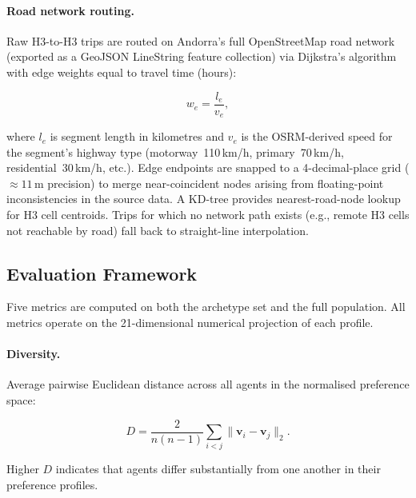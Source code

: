 \documentclass[sustainability,article,submit,pdftex,moreauthors]{Definitions/mdpi}
\begin{document}
\paragraph{Road network routing.}
Raw H3-to-H3 trips are routed on Andorra's full OpenStreetMap road network
(exported as a GeoJSON LineString feature collection) via Dijkstra's
algorithm with edge weights equal to travel time (hours):

\begin{linenomath}
\begin{equation}
  w_e = \frac{l_e}{v_e},
  \label{eq:edge_weight}
\end{equation}
\end{linenomath}

where $l_e$ is segment length in kilometres and $v_e$ is the OSRM-derived
speed for the segment's highway type (motorway~110\,km/h, primary~70\,km/h,
residential~30\,km/h, etc.). Edge endpoints are snapped to a 4-decimal-place
grid ($\approx11$\,m precision) to merge near-coincident nodes arising from
floating-point inconsistencies in the source data. A KD-tree provides
nearest-road-node lookup for H3 cell centroids. Trips for which no network
path exists (e.g., remote H3 cells not reachable by road) fall back to
straight-line interpolation.

\subsection{Evaluation Framework}
\label{subsec:metrics}

Five metrics are computed on both the archetype set and the full population.
All metrics operate on the 21-dimensional numerical projection of each
profile.

\paragraph{Diversity.}
Average pairwise Euclidean distance across all agents in the normalised
preference space:

\begin{linenomath}
\begin{equation}
  D = \frac{2}{n(n-1)} \sum_{i < j} \|\mathbf{v}_i - \mathbf{v}_j\|_2.
  \label{eq:diversity}
\end{equation}
\end{linenomath}

Higher $D$ indicates that agents differ substantially from one another
in their preference profiles.
\end{document}
